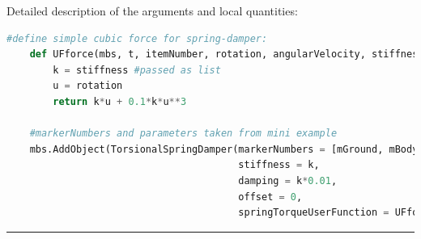 	Detailed description of the arguments and local quantities:
    \finishTable
    \userFunctionExample{}
    \pythonstyle
    \begin{lstlisting}[language=Python]
    #define simple cubic force for spring-damper:
    def UFforce(mbs, t, itemNumber, rotation, angularVelocity, stiffness, damping, offset): 
        k = stiffness #passed as list
        u = rotation
        return k*u + 0.1*k*u**3
    
    #markerNumbers and parameters taken from mini example
    mbs.AddObject(TorsionalSpringDamper(markerNumbers = [mGround, mBody], 
                                        stiffness = k, 
                                        damping = k*0.01, 
                                        offset = 0,
                                        springTorqueUserFunction = UFforce))
    \end{lstlisting}
\vspace{6pt}\par\noindent\rule{\textwidth}{0.4pt}
\label{miniExample_ObjectConnectorTorsionalSpringDamper}
\pythonstyle
